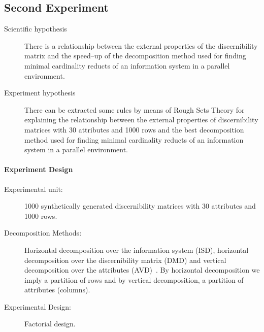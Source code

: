 \documentclass[11pt]{article}   %
\begin{document}
\subsection{Second Experiment}
  \begin{description}
  \item[Scientific hypothesis] There is a relationship between the external properties of the discernibility
  							   matrix and the speed--up of the decomposition method used for finding minimal
  							   cardinality reducts of an information	system in a parallel environment.
  \item[Experiment hypothesis] There can be extracted some rules by means of Rough Sets Theory for explaining
  							   the relationship between the external properties of discernibility matrices
  							   with 30 attributes and 1000 rows and the best decomposition method used for finding
  							   minimal cardinality reducts of an information	system in a parallel environment.
  \end{description}
  \paragraph{Experiment Design} 
	  \begin{description}
	  	\item[Experimental unit:] 1000 synthetically generated discernibility matrices with 30 attributes and
	  							  1000 rows.
	  	\item[Decomposition Methods:] Horizontal decomposition over the information system (ISD), horizontal
	  								 decomposition over the discernibility matrix (DMD) and vertical decomposition 
	  								 over the attributes (AVD)~\cite{Strakowski08}. By horizontal decomposition 
	  								 we imply a partition of rows and by vertical decomposition, a partition of
	  								 attributes (columns).
	  	\item[Experimental Design:] Factorial design.
	  \end{description}
\end{document}
